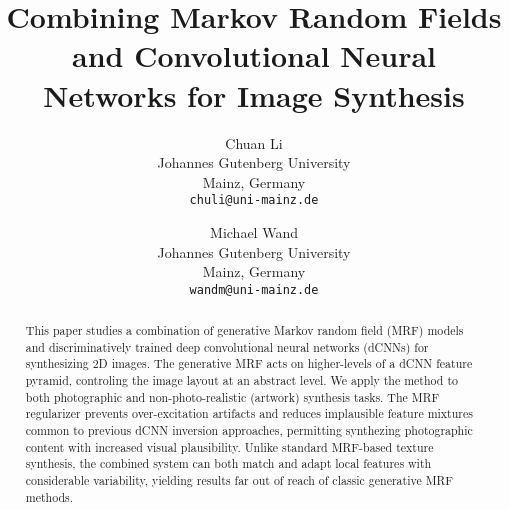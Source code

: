 \documentclass[10pt,twocolumn,letterpaper]{article}
\begin{document}
\title{Combining Markov Random Fields and Convolutional Neural Networks for Image Synthesis}

\author{Chuan Li\\
Johannes Gutenberg University\\
Mainz, Germany\\
{\tt\small chuli@uni-mainz.de}
\and
Michael Wand\\
Johannes Gutenberg University\\
Mainz, Germany\\
{\tt\small wandm@uni-mainz.de}
}

\maketitle

\begin{abstract}
This paper studies a combination of generative Markov random field (MRF) models and discriminatively trained deep convolutional neural networks (dCNNs) for synthesizing 2D images. The generative MRF acts on higher-levels of a dCNN feature pyramid, controling the image layout at an abstract level.
We apply the method to both photographic and non-photo-realistic (artwork) synthesis tasks. The MRF regularizer prevents over-excitation artifacts and reduces implausible feature mixtures common to previous dCNN inversion approaches, permitting synthezing photographic content with increased visual plausibility. Unlike standard MRF-based texture synthesis, the combined system can both match and adapt local features with considerable variability, yielding results far out of reach of classic generative MRF methods.
%
%
\end{abstract}
\end{document}

